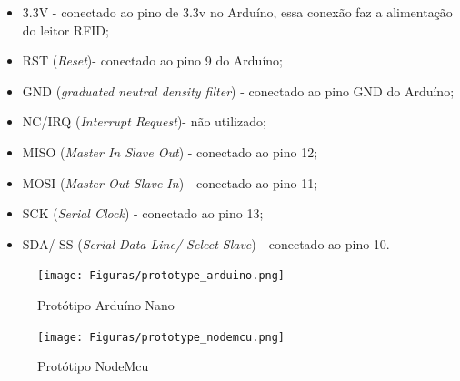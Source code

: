 
\begin{itemize}
    \item 3.3V - conectado ao pino de 3.3v no Arduíno, essa conexão faz a alimentação do leitor RFID;
    \item RST (\textit{Reset})- conectado ao pino 9 do Arduíno;
    \item GND (\textit{graduated neutral density filter}) - conectado ao pino GND do Arduíno;
    \item NC/IRQ (\textit{Interrupt Request})- não utilizado;
    \item MISO (\textit{Master In Slave Out}) - conectado ao pino 12;
    \item MOSI  (\textit{Master Out Slave In}) - conectado ao pino 11;
    \item SCK  (\textit{Serial Clock}) - conectado ao pino 13;
    \item SDA/ SS (\textit{Serial Data Line/ Select Slave}) - conectado ao pino 10.
\end{itemize}    

\begin{figure}[H]
              \caption{\label{fig:prototipo_arduino}{Protótipo Arduíno Nano}}
              \centering
              \texttt{[image: Figuras/prototype\_arduino.png]}            
\end{figure}\begin{figure}[H]
              \caption{\label{fig:prototipo_nodemcu}{Protótipo NodeMcu}}
              \centering
              \texttt{[image: Figuras/prototype\_nodemcu.png]}
\end{figure}


